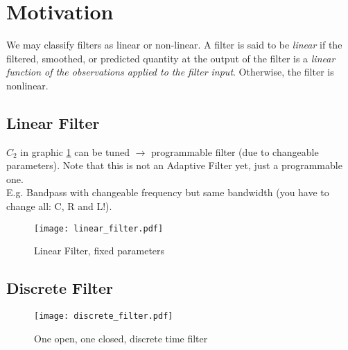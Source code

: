 \section{Motivation}
We may classify filters as linear or non-linear. A filter is said to be \textit{linear} if the filtered, smoothed, or predicted quantity at the output of the filter is a \textit{linear function of the observations applied to the filter input}. Otherwise, the filter is nonlinear.
\subsection{Linear Filter}
$C_2$ in graphic \ref{linearfilter} can be tuned $\rightarrow$ programmable filter (due to changeable parameters). Note that this is not an Adaptive Filter yet, just a programmable one.\\
E.g. Bandpass with changeable frequency but same bandwidth (you have to change all: C, R and L!).
\begin{figure}[H]
	\centering
	\texttt{[image: linear\_filter.pdf]}
	\caption{Linear Filter, fixed parameters}
	\label{linearfilter} 
\end{figure}
\subsection{Discrete Filter}
\begin{figure}[H]
	\centering
	\texttt{[image: discrete\_filter.pdf]}
	\caption{One open, one closed, discrete time filter}
	\label{discretefilter} 
\end{figure}
